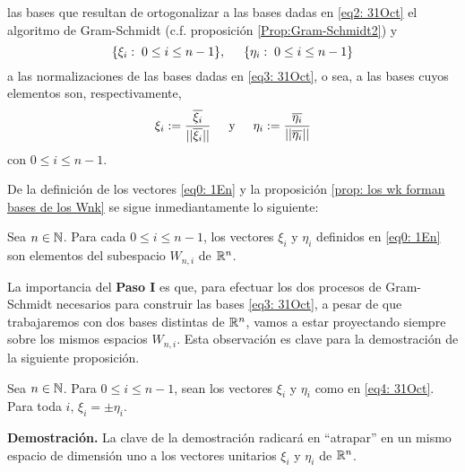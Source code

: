 \begin{itemize}
las bases que resultan de ortogonalizar a 
las bases dadas en \eqref{eq2: 31Oct} el
algoritmo de Gram-Schmidt
(c.f. proposición \ref{Prop:Gram-Schmidt2}) y 
\begin{equation}
\label{eq4: 31Oct}
\{\xi_{i}: \hspace{0.1cm} 0 \leq i \leq n-1  \}, \hspace{0.5cm}
\{\eta_{i}: \hspace{0.1cm} 0 \leq i \leq n-1 \}
\end{equation}
a las normalizaciones de las bases dadas en 
\eqref{eq3: 31Oct}, o sea, a las bases cuyos elementos son,
respectivamente,
\begin{equation}
\label{eq0: 1En}
\xi_{i}:= \frac{\overline{\xi_{i}}}{||\overline{\xi_{i}}||}
\hspace{0.5cm} \text{y} \hspace{0.5cm}
\eta_{i}:= \frac{\overline{\eta_{i}}}{||\overline{\eta_{i}}||}
\end{equation}
con $0 \leq i \leq n-1$.

De la definición de los vectores \eqref{eq0: 1En}
y la proposición \ref{prop: los wk forman bases de los Wnk} se
sigue inmediantamente lo siguiente:

\begin{obs}
\label{obs: los xi y los etai son elementos de Wni}
Sea $n \in \mathbb{N}$. 
Para cada $0 \leq i \leq n-1$, los vectores
$\xi_{i}$ y $\eta_{i}$ 
definidos en \eqref{eq0: 1En} \\
son elementos del
subespacio $W_{n, i}$ de $\mathbb{R}^{n}$.
\end{obs}

La importancia del \textbf{Paso I} es que, 
para efectuar los dos
procesos de Gram-Schmidt necesarios para
construir las bases 
\eqref{eq3: 31Oct}, a pesar de que trabajaremos
con dos bases distintas de $\mathbb{R}^{n}$,
vamos a estar proyectando siempre sobre 
los mismos espacios $W_{n,i}$.
Esta observación es clave para la 
demostración de la siguiente proposición.


\begin{prop} \label{prop:signo}
Sea $n \in \mathbb{N}$.
Para $0 \leq i \leq n-1$, sean los vectores $\xi_{i}$
y $\eta_{i}$ como en \eqref{eq4: 31Oct}. \\
Para toda $i$, $\xi_{i}= \pm \eta_{i}$.
\end{prop}
\noindent
\textbf{Demostración.}
La clave de la demostración
radicará en ``atrapar'' en un mismo espacio de 
dimensión uno a los vectores
unitarios $\xi_{i}$ y $\eta_{i}$ de $\mathbb{R}^{n}$. 



\end{itemize}
